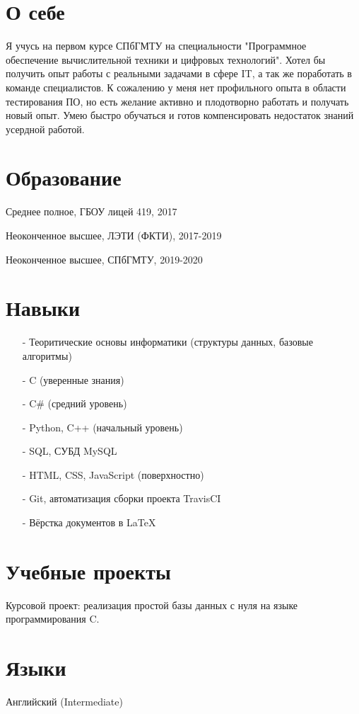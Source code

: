 \documentclass[11pt,a4paper]{moderncv}
\begin{document}
\maketitle

\section{О себе} %
Я учусь на первом курсе СПбГМТУ на специальности "Программное обеспечение вычислительной техники и цифровых технологий".
Хотел бы получить опыт работы с реальными задачами в сфере IT,
а так же поработать в команде специалистов.
К сожалению у меня нет профильного опыта в области тестирования ПО,
но есть желание активно и плодотворно работать и получать новый опыт.
Умею быстро обучаться и готов компенсировать недостаток знаний усердной работой.
\section{Образование}
Среднее полное, ГБОУ лицей 419, 2017

Неоконченное высшее, ЛЭТИ (ФКТИ), 2017-2019

Неоконченное высшее, СПбГМТУ, 2019-2020


\section{Навыки}
\begin{enumerate}
    \item[-] Теоритические основы информатики (структуры данных, базовые алгоритмы)
    \item[-] C (уверенные знания)
    \item[-] C\# (средний уровень)
    \item[-] Python, C++ (начальный уровень)
    \item[-] SQL, СУБД MySQL
    \item[-] HTML, CSS, JavaScript (поверхностно)
    \item[-] Git, автоматизация сборки проекта TravisCI
    \item[-] Вёрстка документов в LaTeX
\end{enumerate}

\section{Учебные проекты}
Курсовой проект: реализация простой базы данных с нуля на языке программирования C.
\section{Языки}
Английский (Intermediate)
 
\end{document}

